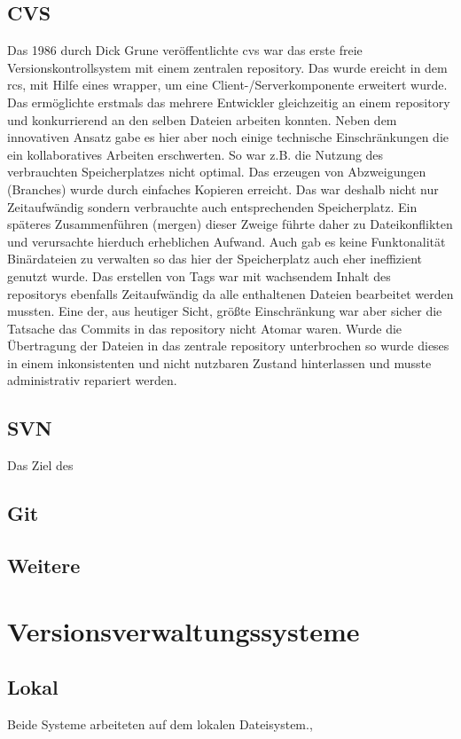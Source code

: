 \subsection{CVS}\label{sec:cvs}
Das 1986 durch Dick Grune veröffentlichte \acrfull{cvs} war das erste freie
Versionskontrollsystem mit einem zentralen \gls{repository}. Das wurde ereicht
in dem \acrshort{rcs}, mit Hilfe eines \gls{wrapper}, um eine
Client-/Serverkomponente erweitert wurde. Das ermöglichte erstmals das mehrere
Entwickler gleichzeitig an einem \gls{repository} und konkurrierend an den
selben Dateien arbeiten konnten. Neben dem innovativen Ansatz gabe es hier aber
noch einige technische Einschränkungen die ein kollaboratives Arbeiten
erschwerten. So war z.B. die Nutzung des verbrauchten Speicherplatzes nicht
optimal. Das erzeugen von Abzweigungen (Branches) wurde durch einfaches
Kopieren erreicht. Das war deshalb nicht nur Zeitaufwändig sondern verbrauchte
auch entsprechenden Speicherplatz. Ein späteres Zusammenführen (mergen) dieser
Zweige führte daher zu Dateikonflikten und verursachte hierduch erheblichen
Aufwand. Auch gab es keine Funktonalität Binärdateien zu verwalten so das hier
der Speicherplatz auch eher ineffizient genutzt wurde. Das erstellen von Tags
war mit wachsendem Inhalt des \glspl{repository} ebenfalls Zeitaufwändig da
alle enthaltenen Dateien bearbeitet werden mussten. Eine der, aus heutiger
Sicht, größte Einschränkung war aber sicher die Tatsache das Commits in das
\gls{repository} nicht Atomar waren. Wurde die Übertragung der Dateien in das
zentrale \gls{repository} unterbrochen so wurde dieses in einem inkonsistenten
und nicht nutzbaren Zustand hinterlassen und musste administrativ repariert
werden. \cite[s.~382-383]{cd}

\subsection{SVN}
Das Ziel des 
\subsection{Git}
\subsection{Weitere}
\section{Versionsverwaltungssysteme}
\subsection{Lokal}
Beide Systeme arbeiteten auf dem lokalen
Dateisystem.,

